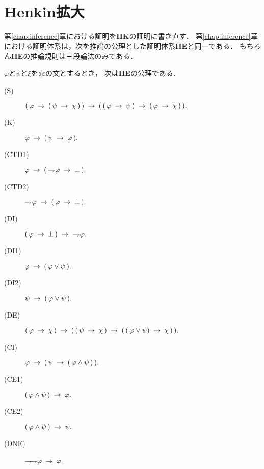 \section{Henkin拡大}
	第\ref{chap:inference}章における証明を{\bf HK}の証明に書き直す．
	第\ref{chap:inference}章における証明体系は，次を推論の公理とした証明体系{\bf HE}と同一である．
	もちろん{\bf HE}の推論規則は三段論法のみである．
	
	\begin{screen}
		\begin{logicalaxm}
			$\varphi$と$\psi$と$\xi$を$\lang{\varepsilon}$の文とするとき，
			次は{\bf HE}の公理である．
			\begin{description}
				\item[(S)] $(\, \varphi \rarrow (\, \psi \rarrow \chi\, )\, ) 
					\rarrow (\, (\, \varphi \rarrow \psi\, )
					\rarrow (\, \varphi \rarrow \chi\, )\, ).$
				\item[(K)] $\varphi \rarrow (\, \psi \rarrow \varphi\, ).$
				\item[(CTD1)] $\varphi \rarrow (\, \negation \varphi \rarrow \bot\, ).$
				\item[(CTD2)] $\negation \varphi \rarrow (\, \varphi \rarrow \bot\, ).$
				\item[(DI)] $(\, \varphi \rarrow \bot\, ) \rarrow\ \negation \varphi.$
				\item[(DI1)] $\varphi \rarrow (\, \varphi \vee \psi\, ).$
				\item[(DI2)] $\psi \rarrow (\, \varphi \vee \psi\, ).$
				\item[(DE)] $(\, \varphi \rarrow \chi\, ) \rarrow 
					(\, (\, \psi \rarrow \chi\, ) 
					\rarrow (\, (\, \varphi \vee \psi) \rarrow \chi\, )\, ).$
				\item[(CI)] $\varphi \rarrow (\, \psi \rarrow (\, \varphi \wedge \psi\, )\, ).$
				\item[(CE1)] $(\, \varphi \wedge \psi\, ) \rarrow \varphi.$
				\item[(CE2)] $(\, \varphi \wedge \psi\, ) \rarrow \psi.$
				\item[(DNE)] $\negation \negation \varphi \rarrow \varphi$.
			\end{description}
		\end{logicalaxm}
	\end{screen}
	
